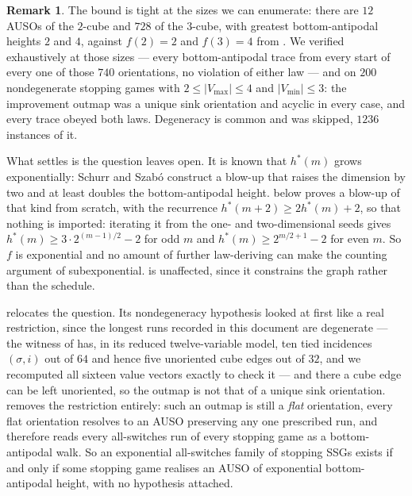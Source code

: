 \documentclass[11pt]{article}
\theoremstyle{plain}
\theoremstyle{definition}
\newtheorem{remark}[theorem]{Remark}
\newcommand{\Vmax}{V_{\max}}
\newcommand{\Vmin}{V_{\min}}
\begin{document}
\begin{remark}\label{rem:f-auso}
The bound is tight at the sizes we can enumerate: there are $12$ AUSOs of the
$2$-cube and $728$ of the $3$-cube, with greatest bottom-antipodal heights $2$
and $4$, against $f(2)=2$ and $f(3)=4$ from . We verified
 exhaustively at those sizes --- every bottom-antipodal
trace from every start of every one of those $740$ orientations, no violation of
either law --- and  on $200$ nondegenerate stopping games
with $2\le|\Vmax|\le4$ and $|\Vmin|\le3$: the improvement outmap was a unique
sink orientation and acyclic in every case, and every trace obeyed both laws.
Degeneracy is common and was skipped, $1236$ instances of it.

What  settles is the question  leaves
open. It is known that $h^{\ast}(m)$ grows exponentially: Schurr and Szab\'o
construct a blow-up that raises the dimension by two and at least doubles the
bottom-antipodal height.  below proves a blow-up of that
kind from scratch, with the recurrence $h^{\ast}(m+2)\ge2h^{\ast}(m)+2$, so
that nothing is imported: iterating it from the one- and two-dimensional
seeds gives $h^{\ast}(m)\ge3\cdot2^{(m-1)/2}-2$ for odd $m$ and
$h^{\ast}(m)\ge2^{m/2+1}-2$ for even $m$. So $f$ is exponential and no
amount of further law-deriving can make the counting argument of
 subexponential.  is unaffected, since it constrains
the graph rather than the schedule.

 relocates the question. Its nondegeneracy hypothesis
looked at first like a real restriction, since the longest runs recorded in
this document are degenerate --- the witness of
 has, in its reduced twelve-variable model, ten
tied incidences $(\sigma,i)$ out of $64$ and hence five unoriented cube edges
out of $32$, and we recomputed all sixteen value vectors exactly to check it
--- and there a cube edge can be left unoriented, so the outmap is not that of
a unique sink orientation.  removes the restriction
entirely: such an outmap is still a \emph{flat} orientation, every flat
orientation resolves to an AUSO preserving any one prescribed run, and
 therefore reads every all-switches run of every
stopping game as a bottom-antipodal walk. So an exponential all-switches
family of stopping SSGs exists if and only if some stopping game realises an
AUSO of exponential bottom-antipodal height, with no hypothesis attached.


\end{remark}
\end{document}
